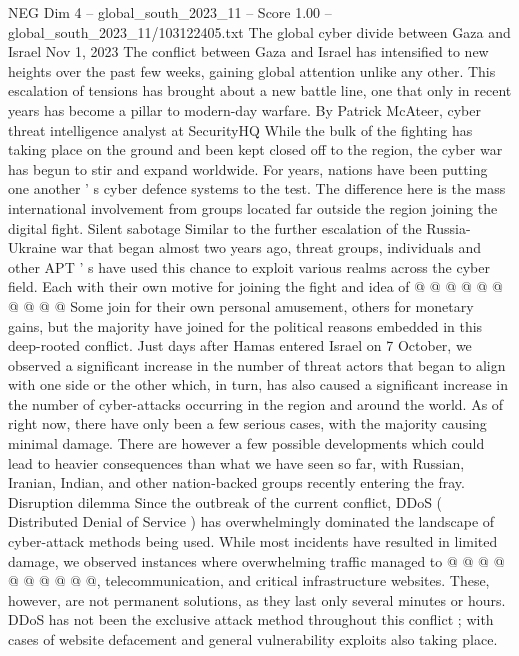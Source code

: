 \begin{textsample}{NEG Dim 4 – global\_south\_2023\_11 – Score 1.00 – global\_south\_2023\_11/103122405.txt}  \label{ex:f4_neg_309}
The global cyber divide between Gaza and Israel Nov 1, 2023 The conflict between Gaza and Israel has intensified to new heights over the past few weeks, gaining global attention unlike any other.
This escalation of tensions has brought about a new battle line, one that only in recent years has become a pillar to modern-day warfare.
By Patrick McAteer, cyber threat intelligence analyst at SecurityHQ While the bulk of the fighting has taking place on the ground and been kept closed off to the region, the cyber war has begun to stir and expand worldwide.
For years, nations have been putting one another ' s cyber defence systems to the test.
The difference here is the mass international involvement from groups located far outside the region joining the digital fight.
Silent sabotage Similar to the further escalation of the Russia-Ukraine war that began almost two years ago, threat groups, individuals and other APT ' s have used this chance to exploit various realms across the cyber field.
Each with their own motive for joining the fight and idea of @ @ @ @ @ @ @ @ @ @ Some join for their own personal amusement, others for monetary gains, but the majority have joined for the political reasons embedded in this deep-rooted conflict.
Just days after Hamas entered Israel on 7 October, we observed a significant increase in the number of threat actors that began to align with one side or the other which, in turn, has also caused a significant increase in the number of cyber-attacks occurring in the region and around the world.
As of right now, there have only been a few serious cases, with the majority causing minimal damage.
There are however a few possible developments which could lead to heavier consequences than what we have seen so far, with Russian, Iranian, Indian, and other nation-backed groups recently entering the fray.
Disruption dilemma Since the outbreak of the current conflict, DDoS ( Distributed Denial of Service ) has overwhelmingly dominated the landscape of cyber-attack methods being used.
While most incidents have resulted in limited damage, we observed instances where overwhelming traffic managed to @ @ @ @ @ @ @ @ @ @, telecommunication, and critical infrastructure websites.
These, however, are not permanent solutions, as they last only several minutes or hours.
DDoS has not been the exclusive attack method throughout this conflict ; with cases of website defacement and general vulnerability exploits also taking place.

\end{textsample}
